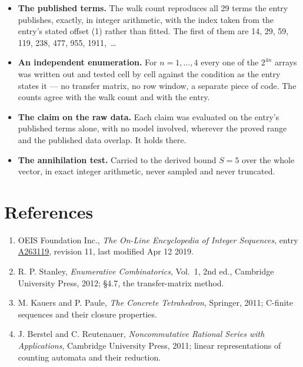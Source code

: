 \documentclass[11pt]{article}
\theoremstyle{definition}
\begin{document}
\begin{itemize}

\item {\bfseries The published terms.} The walk count reproduces all 29 terms the entry publishes, exactly, in integer arithmetic, with the index taken from the entry's stated offset (1) rather than fitted. The first of them are 14, 29, 59, 119, 238, 477, 955, 1911,~\dots

\item {\bfseries An independent enumeration.} For $n = 1,\dots,4$ every one of the $2^{4n}$ arrays was written out and tested cell by cell against the condition as the entry states it --- no transfer matrix, no row window, a separate piece of code. The counts agree with the walk count and with the entry.

\item {\bfseries The claim on the raw data.} Each claim was evaluated on the entry's published terms alone, with no model involved, wherever the proved range and the published data overlap. It holds there.

\item {\bfseries The annihilation test.} Carried to the derived bound $S = 5$ over the whole vector, in exact integer arithmetic, never sampled and never truncated.

\end{itemize}

\section{References}

\begin{enumerate}

\item OEIS Foundation Inc., \emph{The On-Line Encyclopedia of Integer Sequences}, entry \href{https://oeis.org/A263119}{A263119}, revision 11, last modified Apr 12 2019.

\item R. P. Stanley, \emph{Enumerative Combinatorics}, Vol.~1, 2nd ed., Cambridge University Press, 2012; \S4.7, the transfer-matrix method.

\item M. Kauers and P. Paule, \emph{The Concrete Tetrahedron}, Springer, 2011; C-finite sequences and their closure properties.

\item J. Berstel and C. Reutenauer, \emph{Noncommutative Rational Series with Applications}, Cambridge University Press, 2011; linear representations of counting automata and their reduction.

\end{enumerate}
\end{document}
